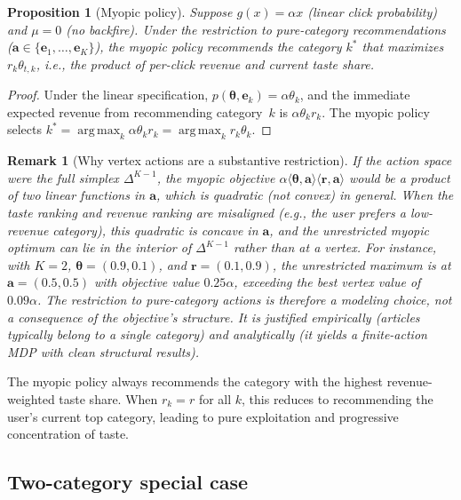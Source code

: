 \documentclass[11pt]{article}
\newtheorem{proposition}{Proposition}
\newtheorem{remark}{Remark}
\DeclareMathOperator*{\argmax}{arg\,max}
\begin{document}
\begin{proposition}[Myopic policy]\label{prop:myopic}
Suppose $g(x) = \alpha x$ (linear click probability) and $\mu = 0$ (no backfire). Under the restriction to pure-category recommendations ($\mathbf{a} \in \{\mathbf{e}_1, \ldots, \mathbf{e}_K\}$), the myopic policy recommends the category $k^*$ that maximizes $r_k \theta_{t,k}$, i.e., the product of per-click revenue and current taste share.
\end{proposition}

\begin{proof}
Under the linear specification, $p(\boldsymbol{\theta}, \mathbf{e}_k) = \alpha \theta_k$, and the immediate expected revenue from recommending category~$k$ is $\alpha \theta_k r_k$. The myopic policy selects $k^* = \argmax_k \alpha \theta_k r_k = \argmax_k r_k \theta_k$.
\end{proof}

\begin{remark}[Why vertex actions are a substantive restriction]\label{rem:vertex}
If the action space were the full simplex $\Delta^{K-1}$, the myopic objective $\alpha \langle \boldsymbol{\theta}, \mathbf{a}\rangle \langle \mathbf{r}, \mathbf{a}\rangle$ would be a product of two linear functions in $\mathbf{a}$, which is quadratic (not convex) in general. When the taste ranking and revenue ranking are misaligned (e.g., the user prefers a low-revenue category), this quadratic is concave in $\mathbf{a}$, and the unrestricted myopic optimum can lie in the interior of $\Delta^{K-1}$ rather than at a vertex. For instance, with $K=2$, $\boldsymbol{\theta} = (0.9, 0.1)$, and $\mathbf{r} = (0.1, 0.9)$, the unrestricted maximum is at $\mathbf{a} = (0.5, 0.5)$ with objective value $0.25\alpha$, exceeding the best vertex value of $0.09\alpha$. The restriction to pure-category actions is therefore a modeling choice, not a consequence of the objective's structure. It is justified empirically (articles typically belong to a single category) and analytically (it yields a finite-action MDP with clean structural results).
\end{remark}

The myopic policy always recommends the category with the highest revenue-weighted taste share. When $r_k = r$ for all $k$, this reduces to recommending the user's current top category, leading to pure exploitation and progressive concentration of taste.

\subsection{Two-category special case}
\label{sec:two_cat}
\end{document}

